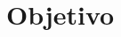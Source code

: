 \documentclass[
	12pt,				%
    oneside,			%
	a4paper,			%
	english,			%
	french,				%
	spanish,			%
	brazil,				%
	]{abntex2}
\begin{document}


\tableofcontents*


\textual


\chapter{Objetivo} %


\end{document}
